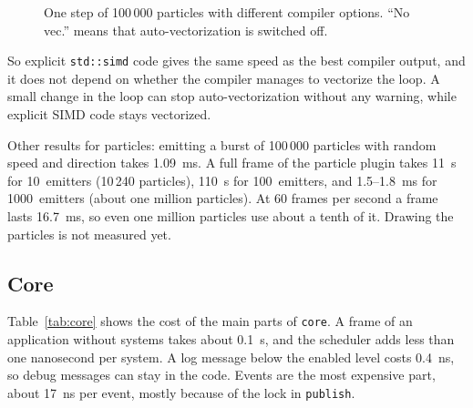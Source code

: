\documentclass[conference]{IEEEtran}
\newcommand{\code}[1]{\texttt{#1}}
\begin{document}
\begin{figure}[htbp]
\centering
{}
\caption{One step of 100\,000 particles with different compiler options. ``No vec.''
means that auto-vectorization is switched off.}
\label{fig:vectorize}
\end{figure}

So explicit \code{std::simd} code gives the same speed as the best compiler output, and
it does not depend on whether the compiler manages to vectorize the loop. A small change
in the loop can stop auto-vectorization without any warning, while explicit SIMD code
stays vectorized.

Other results for particles: emitting a burst of 100\,000 particles with random speed and
direction takes 1.09~ms. A full frame of the particle plugin takes 11~\textmu s for
10~emitters (10\,240 particles), 110~\textmu s for 100~emitters, and 1.5--1.8~ms for
1000~emitters (about one million particles). At 60 frames per second a frame lasts
16.7~ms, so even one million particles use about a tenth of it. Drawing the particles is
not measured yet.

\subsection{Core}

Table~\ref{tab:core} shows the cost of the main parts of \code{core}. A frame of an
application without systems takes about 0.1~\textmu s, and the scheduler adds less than
one nanosecond per system. A log message below the enabled level costs 0.4~ns, so debug
messages can stay in the code. Events are the most expensive part, about 17~ns per event,
mostly because of the lock in \code{publish}.
\end{document}
